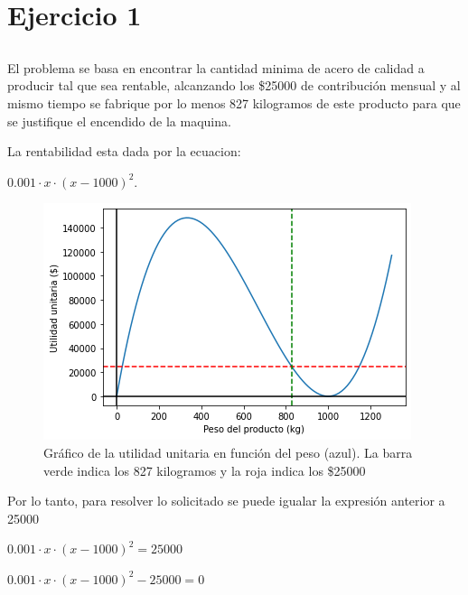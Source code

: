 \section{Ejercicio 1}

\subsection{}
El problema se basa en encontrar la cantidad minima de acero de calidad a producir tal que sea rentable, alcanzando los \$25000 de contribución mensual y al mismo tiempo se fabrique por lo menos 827 kilogramos de este producto para que se justifique el encendido de la maquina.

La rentabilidad esta dada por la ecuacion: 
\begin{center}$0.001 \cdot x \cdot (x-1000)^2$.\end{center}

\begin{figure}[!ht]
	\centering
	\includegraphics[scale=0.8]{graficos/grafico_del_problema_1.png}
	\caption{Gráfico de la utilidad unitaria en función del peso (azul). La barra verde indica los 827 kilogramos y la roja indica los \$25000} \label{grafico_del_problema_1}
\end{figure}


Por lo tanto, para resolver lo solicitado se puede igualar la expresión anterior a 25000

\begin{center}$0.001 \cdot x \cdot (x-1000)^2 = 25000$\end{center}
\begin{center}$0.001 \cdot x \cdot (x-1000)^2 - 25000 = 0$\end{center}

